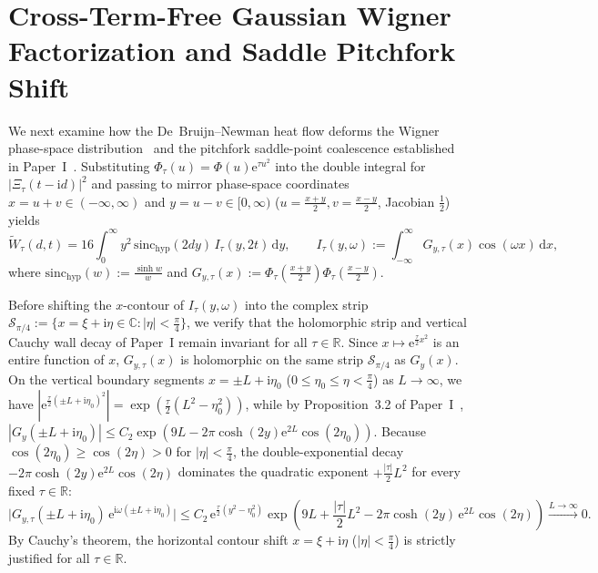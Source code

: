 \documentclass[11pt,reqno]{amsart}
\theoremstyle{definition}
\theoremstyle{remark}
\numberwithin{equation}{section}
\newcommand{\R}{\mathbb{R}}
\newcommand{\C}{\mathbb{C}}
\newcommand{\dd}{\mathrm{d}}
\newcommand{\ee}{\mathrm{e}}
\newcommand{\ii}{\mathrm{i}}
\newcommand{\sinch}{\mathrm{sinc}_{\mathrm{hyp}}}
\begin{document}
\section{Cross-Term-Free Gaussian Wigner Factorization and Saddle Pitchfork Shift}\label{sec:wigner_factorization}

We next examine how the De~Bruijn--Newman heat flow deforms the Wigner phase-space distribution~\cite{wigner1932,hudson1974} and the pitchfork saddle-point coalescence established in Paper~I~\cite{missiaen2026paper1}. Substituting $\Phi_\tau(u) = \Phi(u)\ee^{\tau u^2}$ into the double integral for $|\Xi_\tau(t-\ii d)|^2$ and passing to mirror phase-space coordinates $x = u + v \in (-\infty, \infty)$ and $y = u - v \in [0, \infty)$ ($u = \frac{x+y}{2}, v = \frac{x-y}{2}$, Jacobian $\frac{1}{2}$) yields
\begin{equation}\label{eq:wigner_integral_tau}
\widetilde{W}_\tau(d,t) = 16\int_0^{\infty} y^2\,\sinch(2dy)\,I_\tau(y, 2t)\,\dd y, \qquad I_\tau(y, \omega) := \int_{-\infty}^{\infty} G_{y,\tau}(x)\cos(\omega x)\,\dd x,
\end{equation}
where $\sinch(w) := \frac{\sinh w}{w}$ and $G_{y,\tau}(x) := \Phi_\tau(\frac{x+y}{2})\Phi_\tau(\frac{x-y}{2})$.

Before shifting the $x$-contour of $I_\tau(y,\omega)$ into the complex strip $\mathcal{S}_{\pi/4} := \{x = \xi + \ii\eta \in \C : |\eta| < \frac{\pi}{4}\}$, we verify that the holomorphic strip and vertical Cauchy wall decay of Paper~I remain invariant for all $\tau \in \R$. Since $x \mapsto \ee^{\frac{\tau}{2}x^2}$ is an entire function of $x$, $G_{y,\tau}(x)$ is holomorphic on the same strip $\mathcal{S}_{\pi/4}$ as $G_y(x)$. On the vertical boundary segments $x = \pm L + \ii\eta_0$ ($0 \le \eta_0 \le \eta < \frac{\pi}{4}$) as $L \to \infty$, we have $|\ee^{\frac{\tau}{2}(\pm L + \ii\eta_0)^2}| = \exp(\frac{\tau}{2}(L^2 - \eta_0^2))$, while by Proposition~3.2 of Paper~I~\cite{missiaen2026paper1}, $|G_y(\pm L + \ii\eta_0)| \le C_2\exp(9L - 2\pi\cosh(2y)\ee^{2L}\cos(2\eta_0))$. Because $\cos(2\eta_0) \ge \cos(2\eta) > 0$ for $|\eta| < \frac{\pi}{4}$, the double-exponential decay $-2\pi\cosh(2y)\ee^{2L}\cos(2\eta)$ dominates the quadratic exponent $+\frac{|\tau|}{2}L^2$ for every fixed $\tau \in \R$:
\begin{equation}\label{eq:vertical_wall_decay_tau}
\bigl|G_{y,\tau}(\pm L + \ii\eta_0)\,\ee^{\ii\omega(\pm L + \ii\eta_0)}\bigr| \le C_2\,\ee^{\frac{\tau}{2}(y^2 - \eta_0^2)}\exp\!\left(9L + \frac{|\tau|}{2}L^2 - 2\pi\cosh(2y)\,\ee^{2L}\cos(2\eta)\right) \xrightarrow{L \to \infty} 0.
\end{equation}
By Cauchy's theorem, the horizontal contour shift $x = \xi + \ii\eta$ ($|\eta| < \frac{\pi}{4}$) is strictly justified for all $\tau \in \R$.
\end{document}
